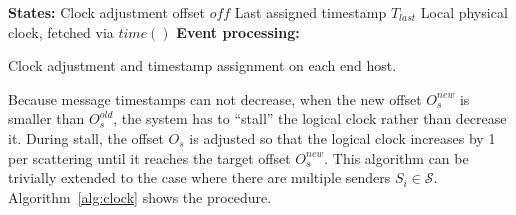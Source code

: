 %

\begin{algorithm}[t]
 \DontPrintSemicolon
 \textbf{States:} Clock adjustment offset $off$\;
 \qquad Last assigned timestamp $T_{last}$\;
 \qquad Local physical clock, fetched via $time()$\;
 \textbf{Event processing:}\;
 \caption{Clock adjustment and timestamp assignment on each end host.}
 \label{alg:clock}
\end{algorithm}

Because message timestamps can not decrease, when the new offset $O_s^{new}$ is smaller than $O_s^{old}$, the system has to ``stall'' the logical clock rather than decrease it.
During stall, the offset $O_s$ is adjusted so that the logical clock increases by 1  per scattering until it reaches the target offset $O_s^{new}$. 
This algorithm can be trivially extended to the case where there are multiple senders $S_i \in \mathcal{S}$.
Algorithm~\ref{alg:clock} shows the procedure.

